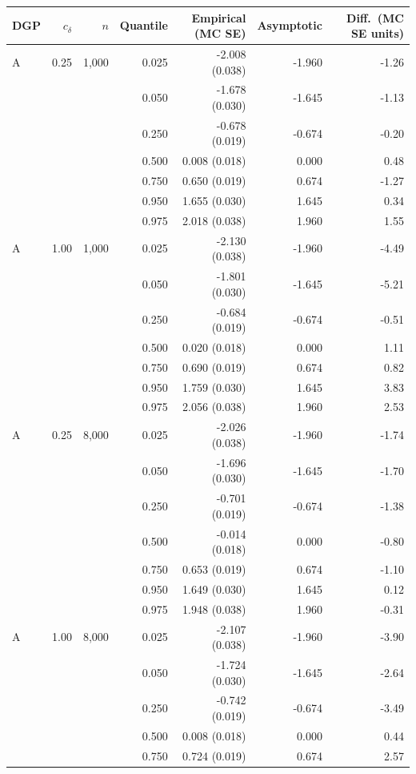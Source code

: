 \begin{tabular}{lrrrrrr}
\toprule
DGP & $c_\delta$ & $n$ & Quantile & Empirical (MC SE) & Asymptotic & Diff.\ (MC SE units) \\
\midrule
A & 0.25 & 1,000 & 0.025 & -2.008 (0.038) & -1.960 & -1.26 \\
 &  &  & 0.050 & -1.678 (0.030) & -1.645 & -1.13 \\
 &  &  & 0.250 & -0.678 (0.019) & -0.674 & -0.20 \\
 &  &  & 0.500 & 0.008 (0.018) & 0.000 & 0.48 \\
 &  &  & 0.750 & 0.650 (0.019) & 0.674 & -1.27 \\
 &  &  & 0.950 & 1.655 (0.030) & 1.645 & 0.34 \\
 &  &  & 0.975 & 2.018 (0.038) & 1.960 & 1.55 \\
\addlinespace
A & 1.00 & 1,000 & 0.025 & -2.130 (0.038) & -1.960 & -4.49 \\
 &  &  & 0.050 & -1.801 (0.030) & -1.645 & -5.21 \\
 &  &  & 0.250 & -0.684 (0.019) & -0.674 & -0.51 \\
 &  &  & 0.500 & 0.020 (0.018) & 0.000 & 1.11 \\
 &  &  & 0.750 & 0.690 (0.019) & 0.674 & 0.82 \\
 &  &  & 0.950 & 1.759 (0.030) & 1.645 & 3.83 \\
 &  &  & 0.975 & 2.056 (0.038) & 1.960 & 2.53 \\
\addlinespace
A & 0.25 & 8,000 & 0.025 & -2.026 (0.038) & -1.960 & -1.74 \\
 &  &  & 0.050 & -1.696 (0.030) & -1.645 & -1.70 \\
 &  &  & 0.250 & -0.701 (0.019) & -0.674 & -1.38 \\
 &  &  & 0.500 & -0.014 (0.018) & 0.000 & -0.80 \\
 &  &  & 0.750 & 0.653 (0.019) & 0.674 & -1.10 \\
 &  &  & 0.950 & 1.649 (0.030) & 1.645 & 0.12 \\
 &  &  & 0.975 & 1.948 (0.038) & 1.960 & -0.31 \\
\addlinespace
A & 1.00 & 8,000 & 0.025 & -2.107 (0.038) & -1.960 & -3.90 \\
 &  &  & 0.050 & -1.724 (0.030) & -1.645 & -2.64 \\
 &  &  & 0.250 & -0.742 (0.019) & -0.674 & -3.49 \\
 &  &  & 0.500 & 0.008 (0.018) & 0.000 & 0.44 \\
 &  &  & 0.750 & 0.724 (0.019) & 0.674 & 2.57 \\

\end{tabular}

